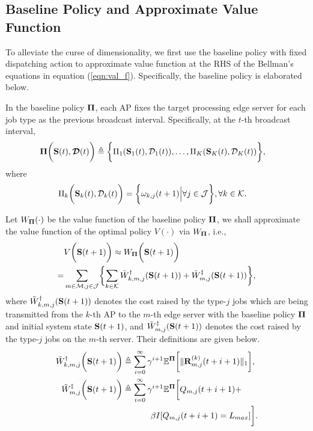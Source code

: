 \subsection{Baseline Policy and Approximate Value Function}
\label{subsec:baseline}
To alleviate the curse of dimensionality, we first use the baseline policy with fixed dispatching action to approximate value function at the RHS of the Bellman's equations in equation (\ref{eqn:val_f}).
Specifically, the baseline policy is elaborated below.

\begin{policy}
    In the baseline policy $\boldsymbol{\Pi}$, each AP fixes the target processing edge server for each job type as the previous broadcast interval. Specifically, at the $t$-th broadcast interval,
    {\small
    \begin{align}
        \boldsymbol{\Pi}\bigg(\mathbf{S}(t),\boldsymbol{\mathcal{D}}(t)\bigg) &\triangleq \bigg\{ 
            \Pi_{1}(\mathbf{S}_{1}(t),\mathcal{D}_{1}(t)),
            \dots,
            \Pi_{K}(\mathbf{S}_{K}(t),\mathcal{D}_{K}(t))
        \bigg\},
    \end{align}
    }
    where
    \begin{align}
        \Pi_{k}\bigg(\mathbf{S}_{k}(t),\mathcal{D}_{k}(t)\bigg)
        &= \bigg\{
            {\omega}_{k,j}(t+1) \Big| \forall j\in\mathcal{J}
        \bigg\}, \forall k\in\mathcal{K}.
    \end{align}
\end{policy}

Let $W_{\boldsymbol{\Pi}}(\cdot)$ be the value function of the baseline policy $\boldsymbol{\Pi}$, we shall approximate the value function of the optimal policy $V(\cdot)$ via $W_{\boldsymbol{\Pi}}$, i.e.,
{\small
\begin{align}
    &V\Paren{\Stat(t+1)} \approx W_{\Baseline}\Paren{\Stat(t+1)}
    \nonumber\\
    =& \sum_{m\in\esSet,j\in\jSpace}\Brace{
        \sum_{k\in\apSet} \tilde{W}^{\AP}_{k,m,j}(\Stat(t+1))
        +\tilde{W}^{\ES}_{m,j}(\Stat(t+1))
    },
    \label{eqn:baseline}
\end{align}
}where $\tilde{W}^{\dagger}_{k,m,j}(\mathbf{S}(t+1))$ denotes the cost raised by the type-$j$ jobs which are being transmitted from the $k$-th AP to the $m$-th edge server with the baseline policy $\boldsymbol{\Pi}$ and initial system state $\mathbf{S}(t+1)$, and $\tilde{W}^{\ddagger}_{m,j}(\mathbf{S}(t+1))$ denotes the cost raised by the type-$j$ jobs on the $m$-th server.
Their definitions are given below.
{\small
\begin{align}
    \tilde{W}^{\dagger}_{k,m,j} \bigg(\mathbf{S}(t+1)\bigg) &\triangleq
        \sum_{i=0}^{\infty} \gamma^{i+1} \mathbb{E}^{\boldsymbol{\Pi}}\bigg[
            \lVert\mathbf{R}^{(k)}_{m,j}(t+i+1)\|_1
        \bigg],
    \\    
    \tilde{W}^{\ddagger}_{m,j} \bigg(\mathbf{S}(t+1)\bigg) &\triangleq
        \sum_{i=0}^{\infty} \gamma^{i+1} \mathbb{E}^{\boldsymbol{\Pi}}\bigg[
            Q_{m,j}(t+i+1) +
            \nonumber\\
            &~~~~~~~~~~\beta I[Q_{m,j}(t+i+1) = L_{max}]
        \bigg].
\end{align}
}

